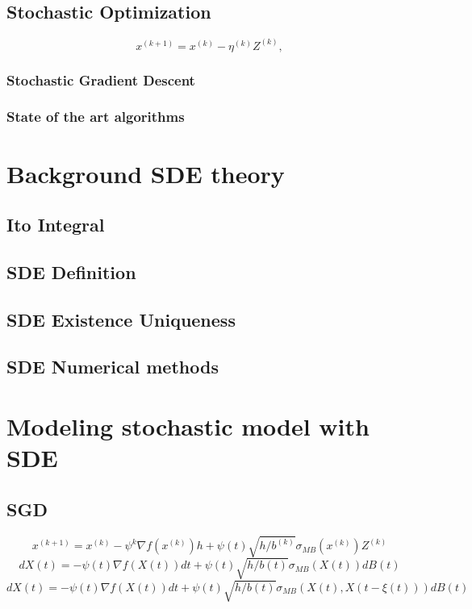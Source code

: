 \documentclass[12pt]{article}
\theoremstyle{definition}
\numberwithin{equation}{section}
\begin{document}
\subsection{Stochastic Optimization}
\label{sec:StochasticOptimization}
\begin{equation}
  x^{(k+1)} = x^{(k)} - \eta^{(k)} Z^{(k)},
\end{equation}
\subsubsection{Stochastic Gradient Descent}

\subsubsection{State of the art algorithms}
\label{sec:StateOfTheArtAlgorithms}

\section{Background SDE theory}
\label{sec:BackgroundSDETheory}
\subsection{Ito Integral}
\label{subsec:ItoIntegral}
\subsection{SDE Definition}
\label{subsec:SDEDefinition}
\subsection{SDE Existence Uniqueness}
\label{subsec:SDEExistenceUniqueness}
\subsection{SDE Numerical methods}

\section{Modeling stochastic model with SDE}
\subsection{SGD}
\begin{equation}
  x^{(k+1)} = x^{(k)} - \psi^k \nabla f(x^{(k)}) h +  \psi(t)\sqrt{h/b^{(k)}} \sigma_{MB}(x^{(k)})Z^{(k)}
\end{equation}
\begin{equation}
  dX(t) = -\psi(t)\nabla f(X(t))dt + \psi(t)\sqrt{h/b(t)} \sigma_{MB}(X(t))dB(t)
\end{equation}
\begin{equation}
  dX(t) = -\psi(t)\nabla f(X(t))dt + \psi(t)\sqrt{h/b(t)} \sigma_{MB}(X(t), X(t-\xi(t)))dB(t)
\end{equation}
\end{document}
